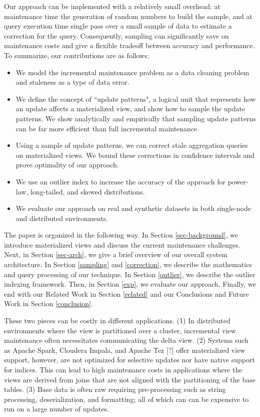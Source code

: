 Our approach can be implemented with a relatively small overhead: at maintenance time the generation of random numbers to build the sample, and at query execution time single pass over a small sample of data to estimate a correction for the query.
Consequently, sampling can significantly save on maintenance costs and give a flexible tradeoff between accuracy and performance.
To summarize, our contributions are as follows:
\begin{itemize}
  \item We model the incremental maintenance problem as a data cleaning problem and staleness as a type of data error.
  \item We define the concept of ``update patterns", a logical unit that represents how an update affects a materialized view, and show how to sample the update patterns. We show analytically and empirically that sampling update patterns can be far more efficient than full incremental maintenance.
  \item Using a sample of update patterns, we can correct stale aggregation queries on materialized views. We bound these corrections in confidence intervals and prove optimality of our approach.
  \item We use an outlier index to increase the accuracy of the approach for power-law, long-tailed, and skewed distributions.
  \item We evaluate our approach on real and synthetic datasets in both single-node and distributed environments.
\end{itemize}

The paper is organized in the following way. 
In Section \ref{sec-background}, we introduce materialized views and discuss the current maintenance challenges.
Next, in Section \ref{sec-arch}, we give a brief overview of our overall system architecture.
In Section \ref{sampling} and \ref{correction}, we describe the mathematics and query processing of our technique.
In Section \ref{outlier}, we describe the outlier indexing framework.
Then, in Section \ref{exp}, we evaluate our approach.
Finally, we end with our Related Work in Section \ref{related} and our Conclusions and Future Work in Section \ref{conclusion}.

\iffalse
 These two pieces can be costly in different
applications. (1) In distributed environments where the view is partitioned
over a cluster, incremental view maintenance often necessitates communicating
the delta view. (2) Systems such as Apache Spark, Cloudera Impala,
and Apache Tez {[}?{]} offer materialized view support, however, are
not optimized for selective updates nor have native support for indices.
This can lead to high maintenance costs in applications where the
views are derived from joins that are not aligned with the partitioning
of the base tables. (3) Base data is often raw requiring pre-processing
such as string processing, deserialization, and formatting; all of
which can can be expensive to run on a large number of updates. 



